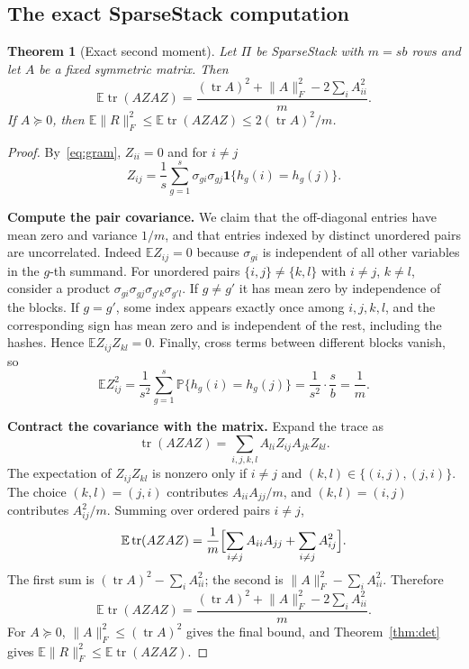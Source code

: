 \documentclass[11pt,a4paper]{article}
\newtheorem{theorem}{Theorem}[section]
\theoremstyle{definition}
\theoremstyle{remark}
\newcommand{\E}{\mathbb E}
\newcommand{\Prob}{\mathbb P}
\newcommand{\tr}{\operatorname{tr}}
\newcommand{\norm}[1]{\lVert#1\rVert}
\newcommand{\1}{\mathbf 1}
\newcommand{\proofstep}[1]{\par\medskip\noindent\textbf{#1}\enspace}
\begin{document}
\subsection{The exact SparseStack computation}
\begin{theorem}[Exact second moment]\label{thm:exact}
Let $\Pi$ be SparseStack with $m=sb$ rows and let $A$ be a fixed symmetric
matrix. Then
\begin{equation}\label{eq:exact}
 \E\tr(AZAZ)=\frac{(\tr A)^2+\norm A_F^2-2\sum_iA_{ii}^2}{m}.
\end{equation}
If $A\succeq0$, then $\E\norm R_F^2\le\E\tr(AZAZ)\le2(\tr A)^2/m$.
\end{theorem}
\begin{proof}
By~\eqref{eq:gram}, $Z_{ii}=0$ and for $i\ne j$
\[
 Z_{ij}=\frac1s\sum_{g=1}^s\sigma_{gi}\sigma_{gj}\1\{h_g(i)=h_g(j)\}.
\]
\proofstep{Compute the pair covariance.}
We claim that the off-diagonal entries have mean zero and variance
$1/m$, and that entries indexed by distinct unordered pairs are
uncorrelated. Indeed $\E Z_{ij}=0$ because $\sigma_{gi}$ is independent
of all other variables in the $g$-th summand. For unordered pairs
$\{i,j\}\ne\{k,l\}$ with $i\ne j$, $k\ne l$, consider a product
$\sigma_{gi}\sigma_{gj}\sigma_{g'k}\sigma_{g'l}$. If $g\ne g'$ it has mean
zero by independence of the blocks. If $g=g'$, some index appears exactly
once among $i,j,k,l$, and the corresponding sign has mean zero and is
independent of the rest, including the hashes. Hence
$\E Z_{ij}Z_{kl}=0$. Finally, cross terms between different blocks
vanish, so
\[
 \E Z_{ij}^2=\frac1{s^2}\sum_{g=1}^s\Prob\{h_g(i)=h_g(j)\}
 =\frac1{s^2}\cdot\frac sb=\frac1m .
\]
\proofstep{Contract the covariance with the matrix.}
Expand the trace as
\[
 \tr(AZAZ)=\sum_{i,j,k,l}A_{li}Z_{ij}A_{jk}Z_{kl}.
\]
The expectation of
$Z_{ij}Z_{kl}$ is nonzero only if $i\ne j$ and $(k,l)\in\{(i,j),(j,i)\}$.
The choice $(k,l)=(j,i)$ contributes $A_{ii}A_{jj}/m$, and $(k,l)=(i,j)$
contributes $A_{ij}^2/m$. Summing over ordered pairs $i\ne j$,
\[
 \E\tr(AZAZ)=\frac1m\Bigl[\sum_{i\ne j}A_{ii}A_{jj}+\sum_{i\ne j}A_{ij}^2\Bigr].
\]
The first sum is $(\tr A)^2-\sum_i A_{ii}^2$; the second is
$\norm A_F^2-\sum_i A_{ii}^2$. Therefore
\[
 \E\tr(AZAZ)=\frac{(\tr A)^2+\norm A_F^2-2\sum_i A_{ii}^2}{m}.
\]
For $A\succeq0$, $\norm A_F^2\le(\tr A)^2$ gives the final bound, and
Theorem~\ref{thm:det} gives $\E\norm R_F^2\le\E\tr(AZAZ)$.
\end{proof}
\end{document}
